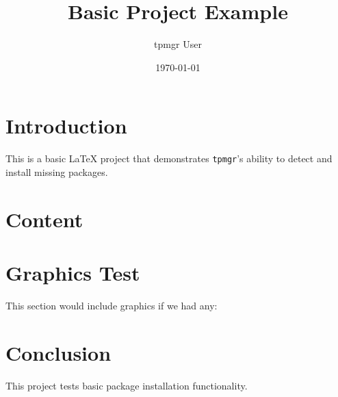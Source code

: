 \documentclass{article}
\title{Basic Project Example}
\author{tpmgr User}
\date{\today}
\begin{document}
\maketitle

\section{Introduction}
This is a basic LaTeX project that demonstrates \texttt{tpmgr}'s ability to detect and install missing packages.

\section{Content}
\lipsum[1-2]

\section{Graphics Test}
This section would include graphics if we had any:

\section{Conclusion}
This project tests basic package installation functionality.
\end{document}
